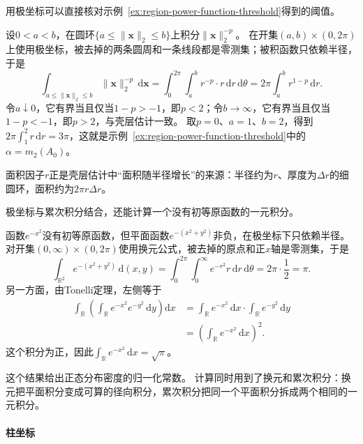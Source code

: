 用极坐标可以直接核对示例~\ref{ex:region-power-function-threshold}得到的阈值。
\begin{example}[用极坐标核对幂函数的可积阈值]
\label{ex:region-polar-power-check}
设$0<a<b$，在圆环$\{a\leq\lVert\bm x\rVert_2\leq b\}$上积分$\lVert\bm x\rVert_2^{-p}$。
在开集$(a,b)\times(0,2\pi)$上使用极坐标，被去掉的两条圆周和一条线段都是零测集；被积函数只依赖半径，于是
\[
 \int_{a\leq\lVert\bm x\rVert_2\leq b}\lVert\bm x\rVert_2^{-p}\,\mathrm d\bm x
 =\int_0^{2\pi}\int_a^br^{-p}\cdot r\,\mathrm dr\,\mathrm d\theta
 =2\pi\int_a^br^{1-p}\,\mathrm dr.
\]
令$a\downarrow0$，它有界当且仅当$1-p>-1$，即$p<2$；令$b\to\infty$，它有界当且仅当$1-p<-1$，即$p>2$，与壳层估计一致。
取$p=0$、$a=1$、$b=2$，得到$2\pi\int_1^2r\,\mathrm dr=3\pi$，这就是示例~\ref{ex:region-power-function-threshold}中的$\alpha=m_2(A_0)$。
\end{example}

面积因子$r$正是壳层估计中“面积随半径增长”的来源：半径约为$r$、厚度为$\Delta r$的细圆环，面积约为$2\pi r\Delta r$。

极坐标与累次积分结合，还能计算一个没有初等原函数的一元积分。
\begin{example}[用极坐标计算Gauss积分]
\label{ex:region-gauss-integral}
函数$e^{-x^2}$没有初等原函数，但平面函数$e^{-(x^2+y^2)}$非负，在极坐标下只依赖半径。
对开集$(0,\infty)\times(0,2\pi)$使用换元公式，被去掉的原点和正$x$轴是零测集，于是
\[
 \int_{\mathbb R^2}e^{-(x^2+y^2)}\,\mathrm d(x,y)
 =\int_0^{2\pi}\int_0^\infty e^{-r^2}r\,\mathrm dr\,\mathrm d\theta
 =2\pi\cdot\frac12=\pi.
\]
另一方面，由Tonelli定理，左侧等于
\[
 \begin{aligned}
 \int_{\mathbb R}\left(\int_{\mathbb R}e^{-x^2}e^{-y^2}\,\mathrm dy\right)\mathrm dx
 &=\int_{\mathbb R}e^{-x^2}\,\mathrm dx\cdot\int_{\mathbb R}e^{-y^2}\,\mathrm dy\\
 &=\left(\int_{\mathbb R}e^{-x^2}\,\mathrm dx\right)^2.
 \end{aligned}
\]
这个积分为正，因此$\int_{\mathbb R}e^{-x^2}\,\mathrm dx=\sqrt\pi$。
\end{example}

这个结果给出正态分布密度的归一化常数。
计算同时用到了换元和累次积分：换元把平面积分变成可算的径向积分，累次积分把同一个平面积分拆成两个相同的一元积分。

\paragraph{柱坐标}

